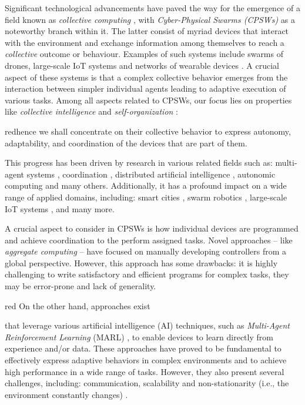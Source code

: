 \documentclass[12pt,a4paper,openright,twoside]{book}
\begin{document}
Significant technological advancements have paved the way for the emergence of a field known as \emph{collective computing} 
    \cite{abowd2016beyond}, with \emph{Cyber-Physical Swarms (CPSWs)} \cite{schranz2021swarm} as a noteworthy branch within it.
    The latter consist of myriad devices that interact with the environment and exchange information among themselves
    to reach a \emph{collective} outcome or behaviour. Examples of such systems include swarms of drones, 
    large-scale IoT systems and networks of wearable devices \cite{10.1145/2800835.2809505, fortino2018wearable}.
    A crucial aspect of these systems is that a complex collective behavior emerges from the interaction between 
    simpler individual agents leading to adaptive execution of various tasks. 
    Among all aspects related to CPSWs, our focus lies on properties like \emph{collective intelligence} \cite{tumer2004survey} 
    and \emph{self-organization} \cite{schmeck2011organic}: \begin{color}{red}hence we shall
    concentrate on their collective behavior to express autonomy, adaptability, and coordination of the devices 
    that are part of them. \end{color}

This progress has been driven by research in various related fields such as: multi-agent systems \cite{dorri2018multi},
    coordination \cite{yang2022overview}, distributed artificial intelligence \cite{bond2014readings}, 
    autonomic computing \cite{parashar2004autonomic} and many others. 
    Additionally, it has a profound impact on a wide range of applied domains, including: smart cities \cite{zedadra2019swarm}, 
    swarm robotics \cite{brambilla2013swarm}, large-scale IoT systems \cite{uslu2023role}, and many more.

A crucial aspect to consider in CPSWs is how individual devices are programmed and achieve coordination to the perform assigned tasks. 
    Novel approaches -- like \emph{aggregate computing} \cite{VIROLI2019100486} -- have focused on manually developing
    controllers from a global perspective. However, this approach has some drawbacks: it is highly challenging to write satisfactory 
    and efficient programs for complex tasks, they may be error-prone and lack of generality.

\begin{color}{red}
On the other hand, approaches exist \end{color}that leverage various artificial intelligence (AI) techniques, 
    such as \emph{Multi-Agent Reinforcement Learning} (MARL) \cite{busoniu2008comprehensive, marlsurvey},
    to enable devices to learn directly from experience and/or data. 
    These approaches have proved to be fundamental to effectively express adaptive behaviors in complex environments
    and to achieve high performance in a wide range of tasks. However, they also present several challenges, including: 
    communication, scalability and non-stationarity 
    (i.e., the environment constantly changes) \cite{hernandez2017survey}.
\end{document}
